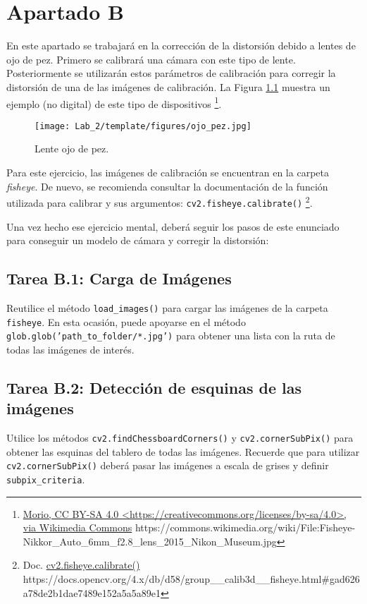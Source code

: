 \chapter{Apartado B}
\label{chapter:tarea_b}

En este apartado se trabajará en la corrección de la distorsión debido a lentes de ojo de pez. Primero se calibrará una cámara con este tipo de lente. Posteriormente se utilizarán estos parámetros de calibración para corregir la distorsión de una de las imágenes de calibración. La Figura \ref{fig:fisheye_camera} muestra un ejemplo (no digital) de este tipo de dispositivos \footnote{ \href{https://commons.wikimedia.org/wiki/File:Fisheye-Nikkor\_Auto\_6mm\_f2.8\_lens\_2015\_Nikon\_Museum.jpg}{Morio, CC BY-SA 4.0 <https://creativecommons.org/licenses/by-sa/4.0>, via Wikimedia Commons} https://commons.wikimedia.org/wiki/File:Fisheye-Nikkor\_Auto\_6mm\_f2.8\_lens\_2015\_Nikon\_Museum.jpg}.

\begin{figure}[h]
    \centering
    \texttt{[image: Lab\_2/template/figures/ojo\_pez.jpg]}
    \caption{Lente ojo de pez.}
    \label{fig:fisheye_camera}
\end{figure}

Para este ejercicio, las imágenes de calibración se encuentran en la carpeta \textit{fisheye}. De nuevo, se recomienda consultar la documentación de la función utilizada para calibrar y sus argumentos: \texttt{cv2.fisheye.calibrate()} \footnote{Doc. \href{https://docs.opencv.org/4.x/db/d58/group\_\_calib3d\_\_fisheye.html\#gad626a78de2b1dae7489e152a5a5a89e}{cv2.fisheye.calibrate()} https://docs.opencv.org/4.x/db/d58/group\_\_calib3d\_\_fisheye.html\#gad626a78de2b1dae7489e152a5a5a89e1}. 

Una vez hecho ese ejercicio mental, deberá seguir los pasos de este enunciado para conseguir un modelo de cámara y corregir la distorsión:

\section*{Tarea B.1: Carga de Imágenes}
Reutilice el método \texttt{load\_images()} para cargar las imágenes de la carpeta \texttt{fisheye}. En esta ocasión, puede apoyarse en el método \texttt{glob.glob('path\_to\_folder/*.jpg')} para obtener una lista con la ruta de todas las imágenes de interés.


\section*{Tarea B.2: Detección de esquinas de las imágenes}
Utilice los métodos \texttt{cv2.findChessboardCorners()} y \texttt{cv2.cornerSubPix()} para obtener las esquinas del tablero de todas las imágenes. Recuerde que para utilizar \texttt{cv2.cornerSubPix()} deberá pasar las imágenes a escala de grises y definir \texttt{subpix\_criteria}.

